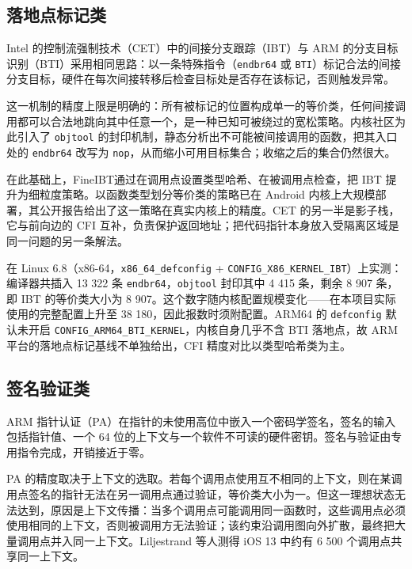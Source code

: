 \subsection{落地点标记类}

Intel 的控制流强制技术（CET）中的间接分支跟踪（IBT）与 ARM 的分支目标识别（BTI）采用相同思路：以一条特殊指令（\lstinline[breaklines=false]@endbr64@ 或 \lstinline[breaklines=false]@BTI@）标记合法的间接分支目标，硬件在每次间接转移后检查目标处是否存在该标记，否则触发异常\citep{shanbhogue2019cet,arm2023armv8}。

这一机制的精度上限是明确的：所有被标记的位置构成单一的等价类，任何间接调用都可以合法地跳向其中任意一个，是一种已知可被绕过的宽松策略\citep{gaidis2023fineibt}。内核社区为此引入了 \lstinline[breaklines=false]@objtool@ 的封印机制，静态分析出不可能被间接调用的函数，把其入口处的 \lstinline[breaklines=false]@endbr64@ 改写为 \lstinline[breaklines=false]@nop@，从而缩小可用目标集合；收缩之后的集合仍然很大。

在此基础上，FineIBT\citep{gaidis2023fineibt}通过在调用点设置类型哈希、在被调用点检查，把 IBT 提升为细粒度策略。以函数类型划分等价类的策略已在 Android 内核上大规模部署，其公开报告给出了这一策略在真实内核上的精度\citep{tolvanen2018androidcfi}。CET 的另一半是影子栈，它与前向边的 CFI 互补，负责保护返回地址\citep{burow2019shadow}；把代码指针本身放入受隔离区域是同一问题的另一条解法\citep{kuznetsov2014cpi}。

在 Linux 6.8（x86-64，\lstinline[breaklines=false]@x86_64_defconfig@ + \lstinline[breaklines=false]@CONFIG_X86_KERNEL_IBT@）上实测：编译器共插入 13 322 条 \lstinline[breaklines=false]@endbr64@，\lstinline[breaklines=false]@objtool@ 封印其中 4 415 条，剩余 8 907 条，即 IBT 的等价类大小为 8 907。这个数字随内核配置规模变化——在本项目实际使用的完整配置上升至 38 180，因此报数时须附配置。ARM64 的 \lstinline[breaklines=false]@defconfig@ 默认未开启 \lstinline[breaklines=false]@CONFIG_ARM64_BTI_KERNEL@，内核自身几乎不含 BTI 落地点，故 ARM 平台的落地点标记基线不单独给出，CFI 精度对比以类型哈希类为主。

\subsection{签名验证类}

ARM 指针认证（PA）在指针的未使用高位中嵌入一个密码学签名，签名的输入包括指针值、一个 64 位的上下文与一个软件不可读的硬件密钥。签名与验证由专用指令完成，开销接近于零。

PA 的精度取决于上下文的选取。若每个调用点使用互不相同的上下文，则在某调用点签名的指针无法在另一调用点通过验证，等价类大小为一。但这一理想状态无法达到，原因是上下文传播：当多个调用点可能调用同一函数时，这些调用点必须使用相同的上下文，否则被调用方无法验证；该约束沿调用图向外扩散，最终把大量调用点并入同一上下文。Liljestrand 等人测得 iOS 13 中约有 6 500 个调用点共享同一上下文\citep{liljestrand2019pac}。

